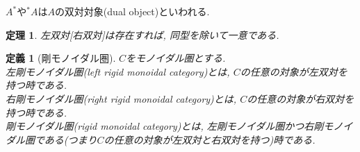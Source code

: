 \documentclass[a4paper,12pt]{ltjsarticle}
\theoremstyle{break}
\newtheorem{defn}[thm]{定義}
\newtheorem{thrm}[thm]{定理}
\newcommand{\xr}[1]{\xrightarrow{#1}}
\newcommand{\id}{\mathrm{id}}
\newcommand{\al}{\alpha}
\newcommand{\la}{\lambda}
\newcommand{\ve}{\varepsilon}
\newcommand{\dav}{\dashv}
\newcommand{\ot}{\otimes}
\numberwithin{equation}{section}
\begin{document}
$A^*$や${}^*A$は$A$の双対対象(dual object)といわれる. 


\begin{thrm}
  左双対[右双対]は存在すれば, 同型を除いて一意である. 
\end{thrm}

\begin{defn}[剛モノイダル圏]
  $C$をモノイダル圏とする. \\
  左剛モノイダル圏(left rigid monoidal category)とは, $C$の任意の対象が左双対を持つ時である. \\
  右剛モノイダル圏(right rigid monoidal category)とは, $C$の任意の対象が右双対を持つ時である. \\
  剛モノイダル圏(rigid monoidal category)とは, 左剛モノイダル圏かつ右剛モノイダル圏である(つまり$C$の任意の対象が左双対と右双対を持つ)時である. 
\end{defn}
\end{document}
